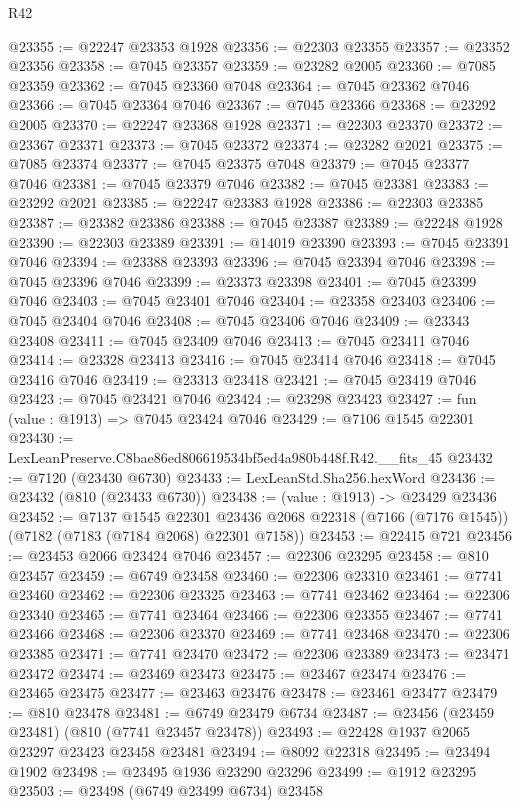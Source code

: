 \begin{lexlean}{R42}
\begin{coremodule}
{@23355 := @22247 @23353 @1928
@23356 := @22303 @23355
@23357 := @23352 @23356
@23358 := @7045 @23357
@23359 := @23282 @2005
@23360 := @7085 @23359
@23362 := @7045 @23360 @7048
@23364 := @7045 @23362 @7046
@23366 := @7045 @23364 @7046
@23367 := @7045 @23366
@23368 := @23292 @2005
@23370 := @22247 @23368 @1928
@23371 := @22303 @23370
@23372 := @23367 @23371
@23373 := @7045 @23372
@23374 := @23282 @2021
@23375 := @7085 @23374
@23377 := @7045 @23375 @7048
@23379 := @7045 @23377 @7046
@23381 := @7045 @23379 @7046
@23382 := @7045 @23381
@23383 := @23292 @2021
@23385 := @22247 @23383 @1928
@23386 := @22303 @23385
@23387 := @23382 @23386
@23388 := @7045 @23387
@23389 := @22248 @1928
@23390 := @22303 @23389
@23391 := @14019 @23390
@23393 := @7045 @23391 @7046
@23394 := @23388 @23393
@23396 := @7045 @23394 @7046
@23398 := @7045 @23396 @7046
@23399 := @23373 @23398
@23401 := @7045 @23399 @7046
@23403 := @7045 @23401 @7046
@23404 := @23358 @23403
@23406 := @7045 @23404 @7046
@23408 := @7045 @23406 @7046
@23409 := @23343 @23408
@23411 := @7045 @23409 @7046
@23413 := @7045 @23411 @7046
@23414 := @23328 @23413
@23416 := @7045 @23414 @7046
@23418 := @7045 @23416 @7046
@23419 := @23313 @23418
@23421 := @7045 @23419 @7046
@23423 := @7045 @23421 @7046
@23424 := @23298 @23423
@23427 := fun (value : @1913) => @7045 @23424 @7046
@23429 := @7106 @1545 @22301
@23430 := LexLeanPreserve.C8bae86ed806619534bf5ed4a980b448f.R42.__fits_45
@23432 := @7120 (@23430 @6730)
@23433 := LexLeanStd.Sha256.hexWord
@23436 := @23432 (@810 (@23433 @6730))
@23438 := (value : @1913) -> @23429 @23436
@23452 := @7137
    @1545
    @22301
    @23436
    @2068
    @22318
    (@7166 (@7176 @1545))
    (@7182 (@7183 (@7184 @2068) @22301 @7158))
@23453 := @22415 @721
@23456 := @23453 @2066 @23424 @7046
@23457 := @22306 @23295
@23458 := @810 @23457
@23459 := @6749 @23458
@23460 := @22306 @23310
@23461 := @7741 @23460
@23462 := @22306 @23325
@23463 := @7741 @23462
@23464 := @22306 @23340
@23465 := @7741 @23464
@23466 := @22306 @23355
@23467 := @7741 @23466
@23468 := @22306 @23370
@23469 := @7741 @23468
@23470 := @22306 @23385
@23471 := @7741 @23470
@23472 := @22306 @23389
@23473 := @23471 @23472
@23474 := @23469 @23473
@23475 := @23467 @23474
@23476 := @23465 @23475
@23477 := @23463 @23476
@23478 := @23461 @23477
@23479 := @810 @23478
@23481 := @6749 @23479 @6734
@23487 := @23456 (@23459 @23481) (@810 (@7741 @23457 @23478))
@23493 := @22428 @1937 @2065 @23297 @23423 @23458 @23481
@23494 := @8092 @22318
@23495 := @23494 @1902
@23498 := @23495 @1936 @23290 @23296
@23499 := @1912 @23295
@23503 := @23498 (@6749 @23499 @6734) @23458
}
\end{coremodule}
\end{lexlean}
